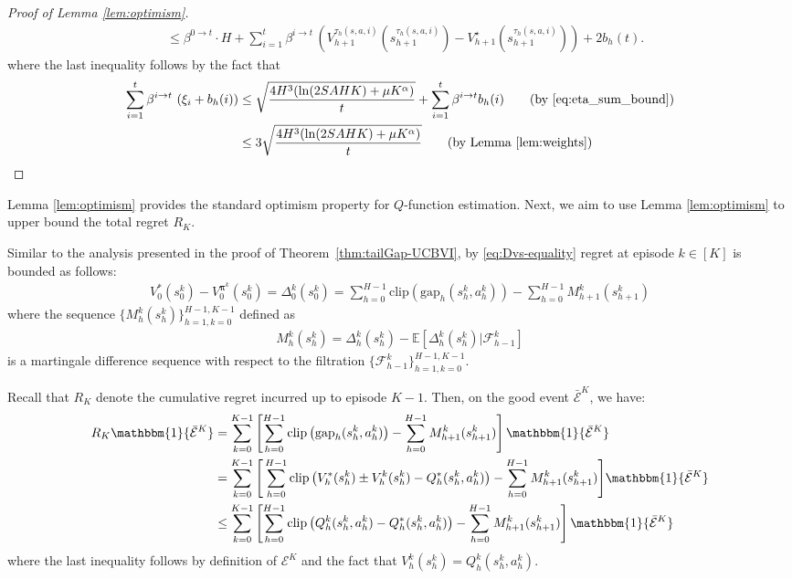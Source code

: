\documentclass[11pt]{article}
\newcommand{\pii}{\boldsymbol{\pi}}
\newcommand{\E} {\mathbb{E}}
\newcommand{\lr}{\beta}
\newcommand{\Dvs}{\Delta}
\newcommand{\Dvsm}{M}
\newcommand{\clip}{\mathrm{clip}}
\newcommand{\gap}{\mathrm{gap}}
\begin{document}
\begin{proof}[Proof of Lemma \ref{lem:optimism}]
\begin{align*}
    &\leq \lr^{0\rightarrow t}\cdot H + \sum_{i=1}^t \lr^{i\rightarrow t} \, \left(V_{h+1}^{\tau_h(s,a,i)}(s_{h+1}^{\tau_h(s,a,i)})-V_{h+1}^\star(s_{h+1}^{\tau_h(s,a,i)})\right) + 2 b_h(t).
\end{align*}
where the last inequality follows by the fact that
\begin{align*}
    \sum_{i=1}^t \lr^{i\rightarrow t} \, \left( \xi_i + b_h(i)\right) &\leq \sqrt{\frac{4H^3(\ln(2SAHK)+\mu K^\alpha)}{t}} + \sum_{i=1}^t \lr^{i\rightarrow t}b_h(i)\tag{by \eqref{eq:eta_sum_bound}}\\
    &\leq 3\sqrt{\frac{4H^3(\ln(2SAHK)+\mu K^\alpha)}{t}} \tag{by Lemma~\ref{lem:weights}}
\end{align*}
\end{proof}

Lemma \ref{lem:optimism} provides the standard optimism property for $Q$-function estimation. Next, we aim to use Lemma \ref{lem:optimism} to upper bound the total regret $R_K$.

Similar to the analysis presented in the proof of Theorem~\ref{thm:tailGap-UCBVI}, by \eqref{eq:Dvs-equality} regret at episode $k\in[K]$ is bounded as follows:
\begin{align*}
    V_0^{*}(s_0^k) - V_0^{\pii^k}(s_0^k) = \Dvs^k_0(s_0^k) =\sum_{h=0}^{H-1}\clip\left(\gap_h(s_h^k,a_h^k)\right) - \sum_{h=0}^{H-1}\Dvsm^k_{h+1}(s_{h+1}^k)
\end{align*}
where the sequence $\{\Dvsm^k_{h}(s_{h}^k)\}_{h=1,k=0}^{H-1,K-1}$ defined as 
\begin{align*}
    \Dvsm^k_{h}(s_{h}^k) = \Dvs^k_{h}(s_{h}^k) - \E\left[\Dvs^k_{h}(s_{h}^k)\big| \mathcal{F}_{h-1}^{k} \right]
\end{align*}
is a martingale difference sequence with respect to the filtration $\{\mathcal{F}_{h-1}^{k}\}_{h=1,k=0}^{H-1,K-1}$. 

Recall that $R_K$ denote the cumulative regret incurred up to episode $K-1$. Then, on the good event $\bar{\mathcal{E}}^K$, we have:
\begin{align}
    R_K\mathbbm{1}\{\bar{\mathcal{E}}^K\} &= \sum_{k=0}^{K-1}\left[\sum_{h=0}^{H-1}\clip\left(\gap_h(s_h^k,a_h^k)\right) - \sum_{h=0}^{H-1}\Dvsm^k_{h+1}(s_{h+1}^k)\right]\mathbbm{1}\{\bar{\mathcal{E}}^K\}\nonumber\\
    &=\sum_{k=0}^{K-1}\Bigg[\sum_{h=0}^{H-1}\clip\left(V_h^{*}(s_h^k) \pm V_h^{k}(s_h^k) - Q_h^{*}(s_h^k,a_h^k)\right) - \sum_{h=0}^{H-1}\Dvsm^k_{h+1}(s_{h+1}^k)\Bigg]\mathbbm{1}\{\bar{\mathcal{E}}^K\}\nonumber\\
    &\leq \sum_{k=0}^{K-1}\left[\sum_{h=0}^{H-1}\clip\left(Q_h^{k}(s_h^k,a_h^k) - Q_h^{*}(s_h^k,a_h^k)\right) - \sum_{h=0}^{H-1}\Dvsm^k_{h+1}(s_{h+1}^k)\right]\mathbbm{1}\{\bar{\mathcal{E}}^K\}\label{eq:18_before}
\end{align}
where the last inequality follows by definition of ${\mathcal{E}}^K$ and the fact that $V_h^{k}(s_h^k) = Q_h^{k}(s_h^k,a_h^k)$.
\end{document}

